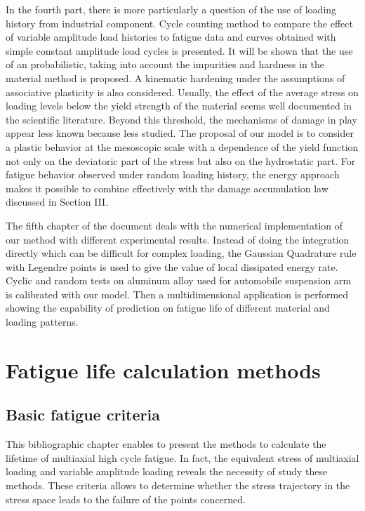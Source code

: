 \documentclass[3p,times,procedia,number]{elsarticle}
\begin{document}
In the fourth part, there is more particularly a question of the use of loading history from industrial component. 
Cycle counting method to compare the effect of variable amplitude load histories to fatigue data and curves obtained with simple constant amplitude load cycles is presented. It will be shown that the use of an probabilistic, taking into account the impurities and hardness in the material method is proposed. A kinematic hardening under the assumptions of associative plasticity is also considered. Usually, the effect of the average stress on loading levels below the yield strength of the material seems well documented in the scientific literature. Beyond this threshold, the mechanisms of damage in play appear less known because less studied. The proposal of our model is to consider a plastic behavior at the mesoscopic scale with a dependence of the yield function not only on the deviatoric part of the stress but also on the hydrostatic part. For fatigue behavior observed under random loading history, the energy approach makes it possible to combine effectively  with the damage accumulation law discussed in Section III.

The fifth chapter of the document deals with the numerical implementation of our method with different experimental results.
Instead of doing the integration directly which can be difficult for complex loading, the Gaussian
Quadrature rule with Legendre points is used to give the value of local dissipated energy rate. Cyclic and random tests on aluminum alloy used for automobile suspension arm is calibrated with our model. Then a multidimensional  application is performed showing the capability of prediction on fatigue life of different material and loading patterns.


\section{Fatigue life calculation methods}

\subsection{Basic fatigue criteria }
This bibliographic chapter enables to present the methods to calculate the lifetime of multiaxial high cycle fatigue. In fact, the equivalent stress of multiaxial loading and variable amplitude loading reveals the necessity of study these methods. These criteria allows to determine whether the stress trajectory in the stress space leads to the failure of the points concerned.
\end{document}
